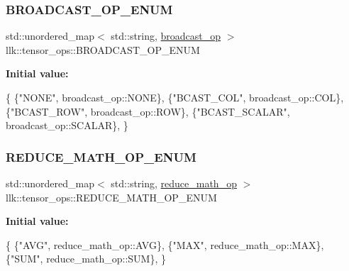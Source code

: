 \subsubsection{\texorpdfstring{B\+R\+O\+A\+D\+C\+A\+S\+T\+\_\+\+O\+P\+\_\+\+E\+N\+UM}{BROADCAST\_OP\_ENUM}}
{\footnotesize\ttfamily std\+::unordered\+\_\+map$<$ std\+::string, \hyperlink{namespacellk_1_1tensor__ops_ac43a7c3eb367c669baaa45a327aeca58}{broadcast\+\_\+op} $>$ llk\+::tensor\+\_\+ops\+::\+B\+R\+O\+A\+D\+C\+A\+S\+T\+\_\+\+O\+P\+\_\+\+E\+N\+UM}

{\bfseries Initial value\+:}
\begin{DoxyCode}
\{
    \{\textcolor{stringliteral}{"NONE"}, broadcast\_op::NONE\},
    \{\textcolor{stringliteral}{"BCAST\_COL"}, broadcast\_op::COL\},
    \{\textcolor{stringliteral}{"BCAST\_ROW"}, broadcast\_op::ROW\},
    \{\textcolor{stringliteral}{"BCAST\_SCALAR"}, broadcast\_op::SCALAR\},
\}
\end{DoxyCode}
\mbox{\label{namespacellk_1_1tensor__ops_a831660d7c372f4d5fa1e1a7cd81096f5}} 
\subsubsection{\texorpdfstring{R\+E\+D\+U\+C\+E\+\_\+\+M\+A\+T\+H\+\_\+\+O\+P\+\_\+\+E\+N\+UM}{REDUCE\_MATH\_OP\_ENUM}}
{\footnotesize\ttfamily std\+::unordered\+\_\+map$<$ std\+::string, \hyperlink{namespacellk_1_1tensor__ops_abbf479560e4c31bec0b83feb6531552c}{reduce\+\_\+math\+\_\+op} $>$ llk\+::tensor\+\_\+ops\+::\+R\+E\+D\+U\+C\+E\+\_\+\+M\+A\+T\+H\+\_\+\+O\+P\+\_\+\+E\+N\+UM}

{\bfseries Initial value\+:}
\begin{DoxyCode}
\{
    \{\textcolor{stringliteral}{"AVG"}, reduce\_math\_op::AVG\},
    \{\textcolor{stringliteral}{"MAX"}, reduce\_math\_op::MAX\},
    \{\textcolor{stringliteral}{"SUM"}, reduce\_math\_op::SUM\},
\}
\end{DoxyCode}
\mbox{\label{namespacellk_1_1tensor__ops_a1ba871d565798ea71360aae08174e879}} 
